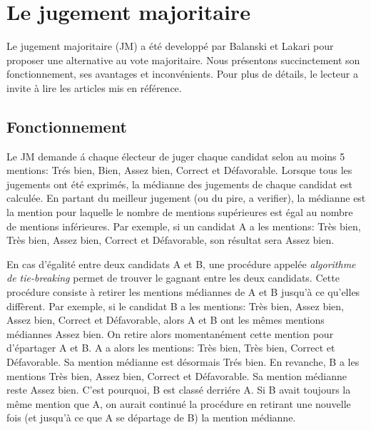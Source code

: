 \documentclass[conference]{IEEEtran}
\begin{document}



\section{Le jugement majoritaire}
\label{sec:mj}

Le jugement majoritaire (JM) a \'et\'e developp\'e par Balanski et Lakari \cite{mj} pour proposer une alternative au vote majoritaire. Nous pr\'esentons succinctement son fonctionnement, ses avantages et inconv\'enients. Pour plus de d\'etails, le lecteur a invite \`a lire les articles mis en r\'ef\'erence.


\subsection{Fonctionnement}

Le JM demande \'a chaque \'electeur de juger chaque candidat selon au moins 5 mentions: Tr\'es bien, Bien, Assez bien, Correct et D\'efavorable. Lorsque tous les jugements ont \'et\'e exprim\'es, la m\'edianne des jugements de chaque candidat est calcul\'ee. En partant du meilleur jugement (ou du pire, a verifier), la m\'edianne est la mention pour laquelle le nombre de mentions sup\'erieures est \'egal au nombre de mentions inf\'erieures. Par exemple, si un candidat A a les mentions: Tr\`es bien, Tr\`es bien, Assez bien, Correct et D\'efavorable, son r\'esultat sera Assez bien. 

En cas d'\'egalit\'e entre deux candidats A et B, une proc\'edure appel\'ee \emph{algorithme de tie-breaking} permet de trouver le gagnant entre les deux candidats. Cette proc\'edure consiste \`a retirer les mentions m\'ediannes de A et B jusqu'\`a ce qu'elles diff\`erent. Par exemple, si le candidat B a les mentions: Tr\`es bien, Assez bien, Assez bien, Correct et D\'efavorable, alors A et B ont les m\^emes mentions m\'ediannes Assez bien. On retire alors momentan\'ement cette mention pour d'\'epartager A et B. A a alors les mentions: Tr\`es bien, Tr\`es bien, Correct et D\'efavorable. Sa mention m\'edianne est d\'esormais Tr\'es bien. En revanche, B a les mentions Tr\`es bien, Assez bien, Correct et D\'efavorable. Sa mention m\'edianne reste Assez bien. C'est pourquoi, B est class\'e derri\'ere A. Si B avait toujours la m\^eme mention que A, on aurait continu\'e la proc\'edure en retirant une nouvelle fois (et jusqu'\`a ce que A se d\'epartage de B) la mention m\'edianne.
\end{document}
